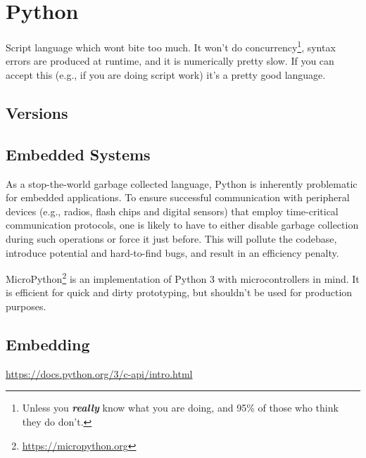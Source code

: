 \section{Python}

Script language which wont bite too much. It won't do concurrency\footnote{Unless you \textsl{\textbf{really}} know what you are doing, and 95\% of those who think they do don't.}, syntax errors are produced at runtime, and it is numerically pretty slow. If you can accept this (e.g., if you are doing script work) it's a pretty good language.

\subsection{Versions}

\subsection{Embedded Systems}

As a stop-the-world garbage collected language, Python is inherently problematic for embedded applications. To ensure successful communication with peripheral devices (e.g., radios, flash chips and digital sensors) that employ time-critical communication protocols, one is likely to have to either disable garbage collection during such operations or force it just before. This will pollute the codebase, introduce potential and hard-to-find bugs, and result in an efficiency penalty.

MicroPython\footnote{\url{https://micropython.org}} is an implementation of Python 3 with microcontrollers in mind. It is efficient for quick and dirty prototyping, but shouldn't be used for production purposes.

\subsection{Embedding}


\url{https://docs.python.org/3/c-api/intro.html}


